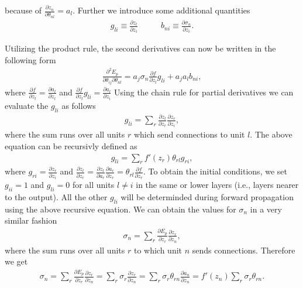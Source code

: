 because of $\frac{\partial z_n}{\partial \theta_{nl}} = a_l$. Further we introduce some additional quantities
\begin{align}
g_{li} \equiv \frac{\partial z_l}{\partial z_i} \quad &\quad
b_{ni} \equiv \frac{\partial \sigma_n}{\partial z_i}.
\end{align}

Utilizing the product rule, the second derivatives can now be written in the following form
\begin{align}
\frac{\partial^2 E_p}{\partial \theta_{ij} \partial \theta_{nl}} = a_j \sigma_n \frac{\partial f}{\partial z_l}g_{li} + a_j a_l b_{ni},
\end{align}
where $ \frac{\partial f}{\partial z_l} =  \frac{\partial a_l}{\partial z_l}$ and $ \frac{\partial f}{\partial z_l}g_{li} =  \frac{\partial a_l}{\partial z_i}$
Using the chain rule for partial derivatives we can evaluate the \( g_{li} \) as follows
\begin{align}
g_{li} = \sum_r \frac{\partial z_l}{\partial z_r} \frac{\partial z_r}{\partial z_i} ,
\end{align}
where the sum runs over all units \( r \) which send connections to unit \( l \). The above equation can be recursivly defined as
\begin{align}
g_{li} = \sum_r f'(z_r) \theta_{rl} g_{ri},
\end{align}
where $g_{ri} = \frac{\partial z_r}{\partial z_i}$ and $ \frac{\partial z_l}{\partial z_r}= \frac{\partial z_l}{\partial a_r}\frac{\partial a_r}{\partial z_r} = \theta_{rl} \frac{\partial f}{\partial z_r}$.
To obtain the initial conditions, we set \(g_{ii} = 1\) and \(g_{li} = 0\) for all units \(l \neq i\) in the same or
lower layers (i.e., layers nearer to the output). All the other \(g_{li}\) will be determinded during forward propagation
using the above recursive equation. We can obtain the values for $\sigma_n$ in a very similar fashion
\begin{align}
\sigma_n = \sum_r \frac{\partial E_p}{\partial z_r} \frac{\partial z_r}{\partial z_n},
\end{align}
where the sum runs over all units \(r\) to which unit \(n\) sends connections. Therefore we get
\begin{align}
    \sigma_n = \sum_r \frac{\partial E_p}{\partial z_r} \frac{\partial z_r}{\partial z_n} = \sum_r \sigma_r \frac{\partial z_r}{\partial z_n} = \sum_r \sigma_r \theta_{rn} \frac{\partial a_n}{\partial z_n} = f'(z_n) \sum_r \sigma_r \theta_{rn}.
\end{align}
